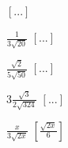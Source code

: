 \begin{esercizio}[\Ast]
\begin{multicols}{4}
\begin{enumeratea}
  \hfill $\left[...\right]$
 \item $\frac 1{3\sqrt{20}}$
  \hfill $\left[...\right]$
 \item $\frac{\sqrt 2}{5\sqrt{50}}$
  \hfill $\left[...\right]$
 \item $3\frac{\sqrt 3}{2\sqrt{324}}$
  \hfill $\left[...\right]$
 \item $\frac x{3\sqrt{2x}}$
  \hfill $\left[\frac{\sqrt{2x}} 6\right]$
 \end{enumeratea}
 \end{multicols}
\end{esercizio}


